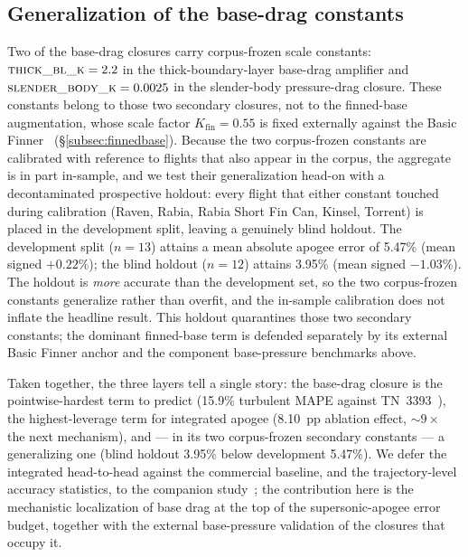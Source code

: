 \subsection{Generalization of the base-drag constants}
\label{subsec:holdout}

Two of the base-drag closures carry corpus-frozen scale constants:
$\textsc{thick\_bl\_k}=2.2$ in the thick-boundary-layer base-drag amplifier and
$\textsc{slender\_body\_k}=0.0025$ in the slender-body pressure-drag closure.
These constants belong to those two secondary closures, not to the finned-base
augmentation, whose scale factor $K_{\text{fin}}=0.55$ is fixed externally
against the Basic Finner~\cite{dupuis1997} (\S\ref{subsec:finnedbase}). Because
the two corpus-frozen constants are calibrated with reference to flights that
also appear in the corpus, the aggregate is in part in-sample, and we test their
generalization head-on with a decontaminated prospective holdout: every flight
that either constant touched during calibration (Raven, Rabia, Rabia Short Fin
Can, Kinsel, Torrent) is placed in the development split, leaving a genuinely
blind holdout. The development split ($n\!=\!13$) attains a mean absolute apogee
error of 5.47\% (mean signed $+0.22\%$); the blind holdout ($n\!=\!12$) attains
3.95\% (mean signed $-1.03\%$). The holdout is \emph{more} accurate than the
development set, so the two corpus-frozen constants generalize rather than
overfit, and the in-sample calibration does not inflate the headline result.
This holdout quarantines those two secondary constants; the dominant finned-base
term is defended separately by its external Basic Finner anchor and the
component base-pressure benchmarks above.

Taken together, the three layers tell a single story: the base-drag closure is
the pointwise-hardest term to predict (15.9\% turbulent MAPE against
TN~3393~\cite{chapman1955}), the highest-leverage term for integrated apogee
(8.10~pp ablation effect, $\sim\!9\times$ the next mechanism), and --- in its two
corpus-frozen secondary constants --- a generalizing one (blind holdout
3.95\% below development 5.47\%). We defer the integrated head-to-head against
the commercial baseline, and the trajectory-level accuracy statistics, to the
companion study~\cite{yu2026jsr}; the contribution here is the mechanistic
localization of base drag at the top of the supersonic-apogee error budget,
together with the external base-pressure validation of the closures that occupy
it.
